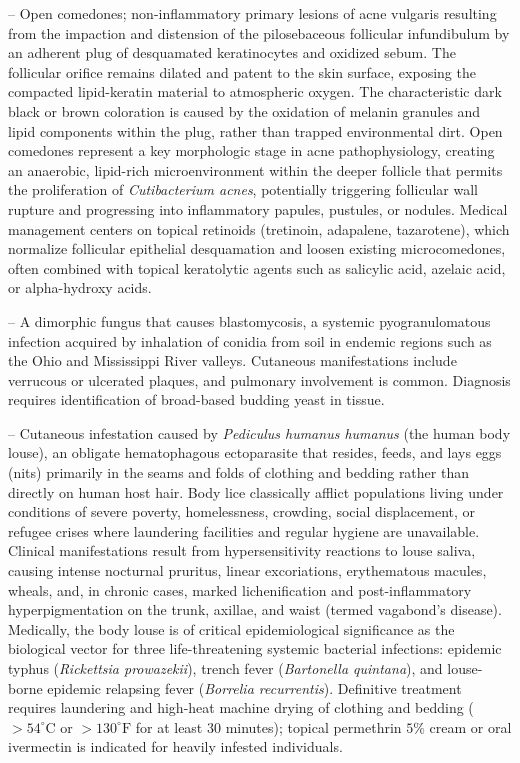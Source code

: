 -- Open comedones; non-inflammatory primary lesions of acne vulgaris resulting from the impaction and distension of the pilosebaceous follicular infundibulum by an adherent plug of desquamated keratinocytes and oxidized sebum. The follicular orifice remains dilated and patent to the skin surface, exposing the compacted lipid-keratin material to atmospheric oxygen. The characteristic dark black or brown coloration is caused by the oxidation of melanin granules and lipid components within the plug, rather than trapped environmental dirt. Open comedones represent a key morphologic stage in acne pathophysiology, creating an anaerobic, lipid-rich microenvironment within the deeper follicle that permits the proliferation of \textit{Cutibacterium acnes}, potentially triggering follicular wall rupture and progressing into inflammatory papules, pustules, or nodules. Medical management centers on topical retinoids (tretinoin, adapalene, tazarotene), which normalize follicular epithelial desquamation and loosen existing microcomedones, often combined with topical keratolytic agents such as salicylic acid, azelaic acid, or alpha-hydroxy acids.

-- A dimorphic fungus that causes blastomycosis, a systemic pyogranulomatous infection acquired by inhalation of conidia from soil in endemic regions such as the Ohio and Mississippi River valleys. Cutaneous manifestations include verrucous or ulcerated plaques, and pulmonary involvement is common. Diagnosis requires identification of broad-based budding yeast in tissue.

-- Cutaneous infestation caused by \textit{Pediculus humanus humanus} (the human body louse), an obligate hematophagous ectoparasite that resides, feeds, and lays eggs (nits) primarily in the seams and folds of clothing and bedding rather than directly on human host hair. Body lice classically afflict populations living under conditions of severe poverty, homelessness, crowding, social displacement, or refugee crises where laundering facilities and regular hygiene are unavailable. Clinical manifestations result from hypersensitivity reactions to louse saliva, causing intense nocturnal pruritus, linear excoriations, erythematous macules, wheals, and, in chronic cases, marked lichenification and post-inflammatory hyperpigmentation on the trunk, axillae, and waist (termed vagabond's disease). Medically, the body louse is of critical epidemiological significance as the biological vector for three life-threatening systemic bacterial infections: epidemic typhus (\textit{Rickettsia prowazekii}), trench fever (\textit{Bartonella quintana}), and louse-borne epidemic relapsing fever (\textit{Borrelia recurrentis}). Definitive treatment requires laundering and high-heat machine drying of clothing and bedding ($>54^\circ\text{C}$ or $>130^\circ\text{F}$ for at least 30 minutes); topical permethrin $5\%$ cream or oral ivermectin is indicated for heavily infested individuals.


